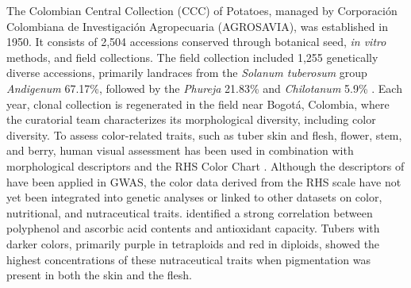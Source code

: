 \documentclass[pdflatex,sn-mathphys-ay]{sn-jnl}%
\begin{document}
The Colombian Central Collection (CCC) of Potatoes, managed by Corporación Colombiana de Investigación Agropecuaria (AGROSAVIA), was established in 1950. It consists of 2,504 accessions conserved through botanical seed, \textit{in vitro} methods, and field collections. The field collection included 1,255 genetically diverse accessions, primarily landraces from the \textit{Solanum tuberosum} group \textit{Andigenum} 67.17\%, followed by the \textit{Phureja} 21.83\% and \textit{Chilotanum} 5.9\% \citep{manrique2023defining, Berdugo2017}. Each year, clonal collection is regenerated in the field near Bogotá, Colombia, where the curatorial team characterizes its morphological diversity, including color diversity. To assess color-related traits, such as tuber skin and flesh, flower, stem, and berry, human visual assessment has been used in combination with morphological descriptors \citep{gomez2000guia} and the RHS Color Chart \citep{RHS2015}.  Although the descriptors of \cite{gomez2000guia} have been applied in GWAS\citep{Berdugo2017, berdugo2023phenotypic}, the color data derived from the RHS scale have not yet been integrated into genetic analyses or linked to other datasets on color, nutritional, and nutraceutical traits. \cite{berdugo2023phenotypic} identified a strong correlation between polyphenol and ascorbic acid contents and antioxidant capacity. Tubers with darker colors, primarily purple in tetraploids and red in diploids, showed the highest concentrations of these nutraceutical traits when pigmentation was present in both the skin and the flesh.

\end{document}
